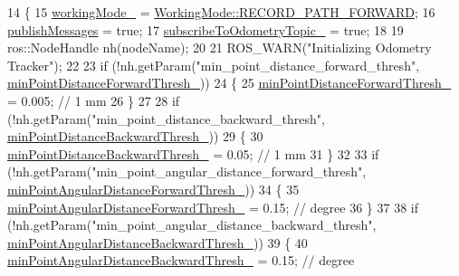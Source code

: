 \begin{DoxyCode}
14 \{
15     \hyperlink{classmove__base__z__client_1_1odom__tracker_1_1OdomTracker_a39c97d7bf6003fde62e0bed1a221e3f0}{workingMode\_} = \hyperlink{namespacemove__base__z__client_1_1odom__tracker_adf3e5fc3644563922cc64a20a0197224a989d06a586bcf9520889228da7faa643}{WorkingMode::RECORD\_PATH\_FORWARD};
16     \hyperlink{classmove__base__z__client_1_1odom__tracker_1_1OdomTracker_a7fa39bb2ddd9e60778687c854ea0c59c}{publishMessages} = \textcolor{keyword}{true};
17     \hyperlink{classmove__base__z__client_1_1odom__tracker_1_1OdomTracker_af07071223326ba38fc95037717102bb4}{subscribeToOdometryTopic\_} = \textcolor{keyword}{true};
18 
19     ros::NodeHandle nh(nodeName);
20 
21     ROS\_WARN(\textcolor{stringliteral}{"Initializing Odometry Tracker"});
22 
23     \textcolor{keywordflow}{if} (!nh.getParam(\textcolor{stringliteral}{"min\_point\_distance\_forward\_thresh"}, 
      \hyperlink{classmove__base__z__client_1_1odom__tracker_1_1OdomTracker_ac306033eff926950e9b9a16e05a0c639}{minPointDistanceForwardThresh\_}))
24     \{
25         \hyperlink{classmove__base__z__client_1_1odom__tracker_1_1OdomTracker_ac306033eff926950e9b9a16e05a0c639}{minPointDistanceForwardThresh\_} = 0.005; \textcolor{comment}{// 1 mm}
26     \}
27 
28     \textcolor{keywordflow}{if} (!nh.getParam(\textcolor{stringliteral}{"min\_point\_distance\_backward\_thresh"}, 
      \hyperlink{classmove__base__z__client_1_1odom__tracker_1_1OdomTracker_afdcfc389baa89c5583bf32bf5fdc7e16}{minPointDistanceBackwardThresh\_}))
29     \{
30         \hyperlink{classmove__base__z__client_1_1odom__tracker_1_1OdomTracker_afdcfc389baa89c5583bf32bf5fdc7e16}{minPointDistanceBackwardThresh\_} = 0.05; \textcolor{comment}{// 1 mm}
31     \}
32 
33     \textcolor{keywordflow}{if} (!nh.getParam(\textcolor{stringliteral}{"min\_point\_angular\_distance\_forward\_thresh"}, 
      \hyperlink{classmove__base__z__client_1_1odom__tracker_1_1OdomTracker_a8675c1d9bd1713d46a467d4aa1aa29a2}{minPointAngularDistanceForwardThresh\_}))
34     \{
35         \hyperlink{classmove__base__z__client_1_1odom__tracker_1_1OdomTracker_a8675c1d9bd1713d46a467d4aa1aa29a2}{minPointAngularDistanceForwardThresh\_} = 0.15; \textcolor{comment}{// degree}
36     \}
37 
38     \textcolor{keywordflow}{if} (!nh.getParam(\textcolor{stringliteral}{"min\_point\_angular\_distance\_backward\_thresh"}, 
      \hyperlink{classmove__base__z__client_1_1odom__tracker_1_1OdomTracker_ad50ecd0f634a3b9d2f68a54788b8c96a}{minPointAngularDistanceBackwardThresh\_}))
39     \{
40         \hyperlink{classmove__base__z__client_1_1odom__tracker_1_1OdomTracker_ad50ecd0f634a3b9d2f68a54788b8c96a}{minPointAngularDistanceBackwardThresh\_} = 0.15; \textcolor{comment}{// degree}

\end{DoxyCode}
